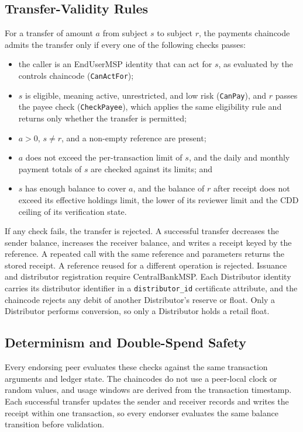 \documentclass[conference]{IEEEtran}
\begin{document}
\subsection{Transfer-Validity Rules}
For a transfer of amount $a$ from subject $s$ to subject $r$, the payments
chaincode admits the transfer only if every one of the following checks passes:
\begin{itemize}
\item the caller is an EndUserMSP identity that can act for $s$, as evaluated by
      the controls chaincode (\texttt{CanActFor});
\item $s$ is eligible, meaning active, unrestricted, and low risk (\texttt{CanPay}), and $r$ passes the payee check (\texttt{CheckPayee}), which applies the same eligibility rule and returns only whether the transfer is permitted;
\item $a>0$, $s\neq r$, and a non-empty reference are present;
\item $a$ does not exceed the per-transaction limit of $s$, and the daily and
      monthly payment totals of $s$ are checked against its limits; and
\item $s$ has enough balance to cover $a$, and the balance of $r$ after receipt
      does not exceed its effective holdings limit, the lower of its reviewer limit and the CDD ceiling of its verification state.
\end{itemize}
If any check fails, the transfer is rejected. A successful transfer decreases the
sender balance, increases the receiver balance, and writes a receipt keyed by the
reference. A repeated call with the same reference and parameters returns the
stored receipt. A reference reused for a different operation is rejected.
Issuance and distributor registration require CentralBankMSP. Each Distributor identity
carries its distributor identifier in a \texttt{distributor\_id} certificate
attribute, and the chaincode rejects any debit of another Distributor's reserve or float.
Only a Distributor performs conversion, so only a Distributor holds a retail float.

\subsection{Determinism and Double-Spend Safety}
Every endorsing peer evaluates these checks against the same transaction arguments
and ledger state. The chaincodes do not use a peer-local clock or random values,
and usage windows are derived from the transaction timestamp. Each successful
transfer updates the sender and receiver records and writes the receipt within one
transaction, so every endorser evaluates the same balance transition before
validation.
\end{document}
